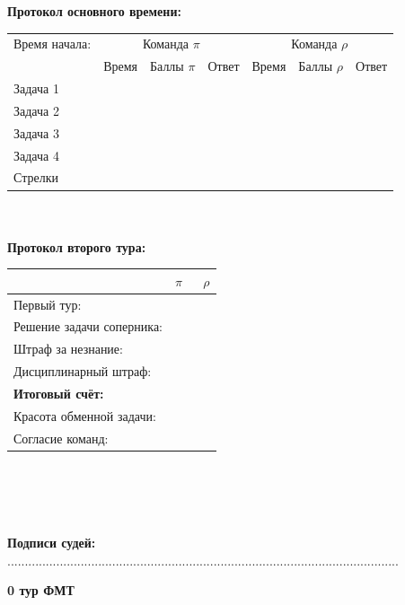 \documentclass[12pt]{article}
\begin{document}
\begin{center}{\bf Протокол основного времени: } \\ 
\begin{tabular}{|p{3.3cm}|p{1.5cm}|p{2cm}|p{1.5cm}|p{1.5cm}|p{2cm}|p{1.5cm}|}
\hline Время начала: & \multicolumn{3}{c|}{Команда $\pi$} & \multicolumn{3}{c|}{Команда $\rho$ }\\\cline{2-7} {} & Время & Баллы $\pi$ & Ответ & Время & Баллы $\rho$ & Ответ \\\hline \hline \center Задача 1 &{}&{}&{}&{}&{}&{}\\[20mm]\hline \hline \center Задача 2 &{}&{}&{}&{}&{}&{}\\[20mm]\hline \hline \center Задача 3 &{}&{}&{}&{}&{}&{}\\[20mm]\hline \hline \center Задача 4 &{}&{}&{}&{}&{}&{}\\[20mm]\hline \hline \center Стрелки &{}&{}&{}&{}&{}&{}\\[20mm]\hline
\end{tabular}
$ $\\
$ $\\
{\bf Протокол второго тура: } \\ 
\begin{tabular}{ | p{7cm} | p{1cm} | p{1cm} |}
\hline
$ $ & \centering $\pi$ & $\;$ $\rho$ \\ \hline\raggedleft Первый тур: & & \\ \hline\raggedleft Решение задачи соперника: & & \\ \hline\raggedleft Штраф за незнание: & & \\ \hline\raggedleft Дисциплинарный штраф: & & \\ \hline\raggedleft \bf Итоговый счёт: & & \\ \hline \hline\raggedleft Красота обменной задачи: & & \\ \hline\raggedleft Согласие команд: & & \\ \hline\end{tabular}\end{center}
$ $\\
$ $\\
$ $\\
$ $\\
{\bf Подписи судей: }................................................................................................................\newpage
\begin{center}
{\Huge \bf 0 тур ФМТ}
\end{center}
\end{document}
